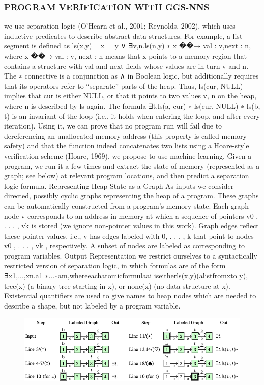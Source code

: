 \documentclass{article}
\begin{document}
\subsubsection{PROGRAM VERIFICATION WITH GGS-NNS}
we use separation logic (O’Hearn et al., 2001;
Reynolds, 2002), which uses inductive predicates to
describe abstract data structures. For example, a list
segment is defined as ls(x,y) ≡ x = y ∨ ∃v,n.ls(n,y) ∗ x ��→ {val : v,next : n}, where x ��→ {val : v, next : n} means that x points to a memory region that contains a structure with val and next fields whose values are in turn v and n. The ∗ connective is a conjunction as ∧ in Boolean logic, but additionally requires that its operators refer to “separate” parts of the heap. Thus, ls(cur, NULL) implies that cur is either NULL, or that it points to two values v, n on the heap, where n is described by ls again. The formula ∃t.ls(a, cur) ∗ ls(cur, NULL) ∗ ls(b, t) is an invariant of the loop (i.e., it holds when entering the loop, and after every iteration). Using it, we can prove that no program run will fail due to dereferencing an unallocated memory address (this property is called memory safety) and that the function indeed concatenates two lists using a Hoare-style verification scheme (Hoare, 1969). we propose to use machine learning. Given a program, we run it a few times and extract the state of memory (represented as a graph; see below) at relevant program locations, and then predict a separation logic formula.
Representing Heap State as a Graph As inputs we consider directed, possibly cyclic graphs representing the heap of a program. These graphs can be automatically constructed from a program’s memory state. Each graph node v corresponds to an address in memory at which a sequence of pointers v0 , . . . , vk is stored (we ignore non-pointer values in this work). Graph edges reflect these pointer values, i.e., v has edges labeled with 0, . . . , k that point to nodes v0 , . . . , vk , respectively. A subset of nodes are labeled as corresponding to program variables.
Output Representation we restrict ourselves to a syntactically restricted version of separation logic, in which formulas are of the form ∃x1,...,xn.a1 ∗...∗am,whereeachatomicformulaai iseitherls(x,y)(alistfromxto y), tree(x) (a binary tree starting in x), or none(x) (no data structure at x). Existential quantifiers are used to give names to heap nodes which are needed to describe a shape, but not labeled by a program variable. 
\begin{figure}[ht]
\vskip 0.2in
\begin{center}
\centerline{\includegraphics[width=\columnwidth]{Images/Bug1-3.png}}
\label{icml-historical}
\end{center}
\vskip -0.2in
\end{figure}
\end{document}
